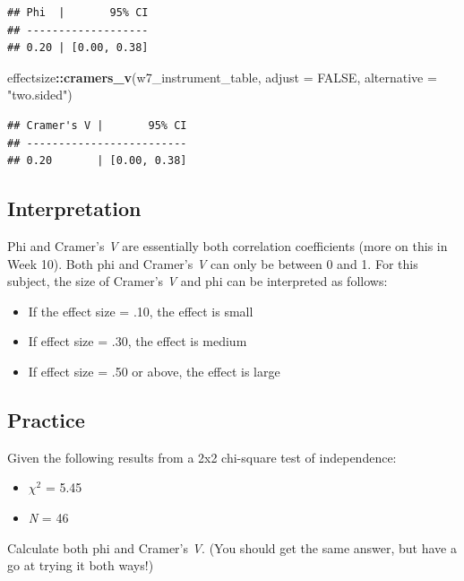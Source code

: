 \documentclass[
]{book}
\newenvironment{Shaded}{\begin{snugshade}}{\end{snugshade}}
\newcommand{\AttributeTok}[1]{\textcolor[rgb]{0.13,0.29,0.53}{#1}}
\newcommand{\ConstantTok}[1]{\textcolor[rgb]{0.56,0.35,0.01}{#1}}
\newcommand{\FunctionTok}[1]{\textcolor[rgb]{0.13,0.29,0.53}{\textbf{#1}}}
\newcommand{\NormalTok}[1]{#1}
\newcommand{\SpecialCharTok}[1]{\textcolor[rgb]{0.81,0.36,0.00}{\textbf{#1}}}
\newcommand{\StringTok}[1]{\textcolor[rgb]{0.31,0.60,0.02}{#1}}
\providecommand{\tightlist}{%
  \setlength{\itemsep}{0pt}\setlength{\parskip}{0pt}}
\begin{document}
\begin{verbatim}
## Phi  |       95% CI
## -------------------
## 0.20 | [0.00, 0.38]
\end{verbatim}

\begin{Shaded}
\begin{Highlighting}[]
\NormalTok{effectsize}\SpecialCharTok{::}\FunctionTok{cramers\_v}\NormalTok{(w7\_instrument\_table, }\AttributeTok{adjust =} \ConstantTok{FALSE}\NormalTok{, }\AttributeTok{alternative =} \StringTok{"two.sided"}\NormalTok{)}
\end{Highlighting}
\end{Shaded}

\begin{verbatim}
## Cramer's V |       95% CI
## -------------------------
## 0.20       | [0.00, 0.38]
\end{verbatim}

\subsection{Interpretation}\label{interpretation}

Phi and Cramer's \emph{V} are essentially both correlation coefficients (more on this in Week 10). Both phi and Cramer's \emph{V} can only be between 0 and 1. For this subject, the size of Cramer's \emph{V} and phi can be interpreted as follows:

\begin{itemize}
\tightlist
\item
  If the effect size = .10, the effect is small
\item
  If effect size = .30, the effect is medium
\item
  If effect size = .50 or above, the effect is large
\end{itemize}

\subsection{Practice}\label{practice}

Given the following results from a 2x2 chi-square test of independence:

\begin{itemize}
\tightlist
\item
  \(\chi^2\) = 5.45
\item
  \emph{N} = 46
\end{itemize}

Calculate both phi and Cramer's \emph{V}. (You should get the same answer, but have a go at trying it both ways!)
\end{document}
